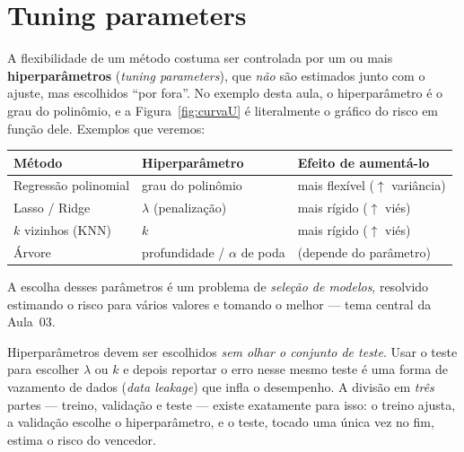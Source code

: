 \documentclass[11pt,a4paper]{article}
\begin{document}
\section{Tuning parameters}
A flexibilidade de um método costuma ser controlada por um ou mais
\textbf{hiperparâmetros} (\emph{tuning parameters}), que \emph{não} são estimados
junto com o ajuste, mas escolhidos ``por fora''. No exemplo desta aula, o
hiperparâmetro é o grau do polinômio, e a Figura~\ref{fig:curvaU} é literalmente o
gráfico do risco em função dele. Exemplos que veremos:
\begin{center}\small
\renewcommand{\arraystretch}{1.25}
\begin{tabular}{@{}lll@{}}
\toprule
\textbf{Método} & \textbf{Hiperparâmetro} & \textbf{Efeito de aumentá-lo} \\
\midrule
Regressão polinomial & grau do polinômio & mais flexível ($\uparrow$ variância) \\
Lasso / Ridge        & $\lambda$ (penalização) & mais rígido ($\uparrow$ viés) \\
$k$ vizinhos (KNN)   & $k$ & mais rígido ($\uparrow$ viés) \\
Árvore               & profundidade / $\alpha$ de poda & (depende do parâmetro) \\
\bottomrule
\end{tabular}
\end{center}
A escolha desses parâmetros é um problema de \emph{seleção de modelos}, resolvido
estimando o risco para vários valores e tomando o melhor --- tema central da
Aula~03.

\begin{atencao}
Hiperparâmetros devem ser escolhidos \emph{sem olhar o conjunto de teste}. Usar o
teste para escolher $\lambda$ ou $k$ e depois reportar o erro nesse mesmo teste é
uma forma de vazamento de dados (\emph{data leakage}) que infla o desempenho. A
divisão em \emph{três} partes --- treino, validação e teste --- existe exatamente
para isso: o treino ajusta, a validação escolhe o hiperparâmetro, e o teste, tocado
uma única vez no fim, estima o risco do vencedor.
\end{atencao}
\end{document}

